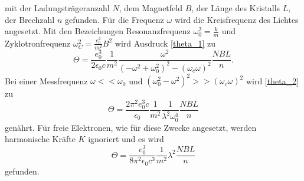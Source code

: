 mit der Ladungsträgeranzahl $N$, dem Magnetfeld $B$, der Länge des Kristalls $L$, der Brechzahl $n$ gefunden.
Für die Frequenz $\omega$ wird die Kreisfrequenz des Lichtes angesetzt.
Mit den Bezeichungen Resonanzfrequenz $\omega_0^2 =\frac{k}{m}$ und Zyklotronfrequenz $\omega_C^2 =\frac{e_0^2}{m^2} B^2$ wird Ausdruck \eqref{theta_1} zu
\begin{equation}
    \Theta = \frac{e_0^3}{2\epsilon_0 c}\frac{1}{m^2} \frac{\omega^2}{(-\omega^2+\omega_0^2)^2-(\omega_c\omega)^2} \frac{NBL}{n}.
    \label{theta_2}
\end{equation}
Bei einer Messfrequenz $\omega << \omega_0$ und $(\omega_0^2-\omega^2)^2>>(\omega_c\omega)^2$ wird \eqref{theta_2} zu
\begin{equation}
    \Theta = \frac{2\pi^2 e_0^3 c}{\epsilon_0} \frac{1}{m^2} \frac{1}{\lambda^2\omega_0^4} \frac{NBL}{n}
\end{equation}
genährt.
Für freie Elektronen, wie für diese Zwecke angesetzt, werden harmonische Kräfte $K$ ignoriert und es wird
\begin{equation}
    \Theta = \frac{e_0^3}{8\pi^2\epsilon_0 c^3} \frac{1}{m^2} \lambda^2 \frac{NBL}{n}
\end{equation}
gefunden.
